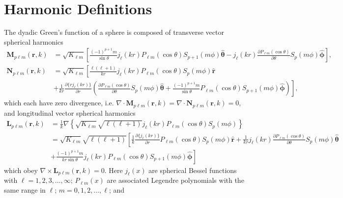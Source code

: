 
\section{Harmonic Definitions}\label{app:harmonicAlgebra}

The dyadic Green's function of a sphere is composed of transverse vector spherical harmonics
\begin{equation}
\begin{split}
\mathbf{M}_{p\ell m}(\mathbf{r},k) &= \sqrt{K_{\ell m}}\left[\frac{(-1)^{p + 1}m}{\sin\theta}j_\ell(kr)P_{\ell m}(\cos\theta)S_{p+1}(m\phi)\hat{\bm{\theta}} - j_\ell(kr)\frac{\partial P_{\ell m}(\cos\theta)}{\partial\theta}S_p(m\phi)\hat{\bm{\phi}}\right],\\[0.5em]
\mathbf{N}_{p\ell m}(\mathbf{r},k) &= \sqrt{K_{\ell m}}\left[\frac{\ell(\ell + 1)}{kr}j_\ell(kr)P_{\ell m}(\cos\theta)S_p(m\phi)\hat{\mathbf{r}}\right.\\
&+ \left.\frac{1}{kr}\frac{\partial\{rj_\ell(kr)\}}{\partial r}\left(\frac{\partial P_{\ell m}(\cos\theta)}{\partial\theta}S_p(m\phi)\hat{\bm{\theta}} + \frac{(-1)^{p+1}m}{\sin\theta}P_{\ell m}(\cos\theta)S_{p + 1}(m\phi)\hat{\bm{\phi}}\right)\right],
\end{split}
\end{equation}
which each have zero divergence, i.e. $\nabla\cdot\mathbf{M}_{p\ell m}(\mathbf{r},k) = \nabla\cdot\mathbf{N}_{p\ell m}(\mathbf{r},k) = 0$, and longitudinal vector spherical harmonics
\begin{equation}
\begin{split}
\mathbf{L}_{p\ell m}(\mathbf{r},k) &= \frac{1}{k}\nabla\left\{\sqrt{K_{\ell m}}\sqrt{\ell(\ell + 1)}j_\ell(kr)P_{\ell m}(\cos\theta)S_p(m\phi)\right\}\\
&= \sqrt{K_{\ell m}}\sqrt{\ell(\ell + 1)}\left[\frac{1}{k}\frac{\partial\{j_\ell(kr)\}}{\partial r}P_{\ell m}(\cos\theta)S_p(m\phi)\hat{\mathbf{r}} + \frac{1}{kr}j_\ell(kr)\frac{\partial P_{\ell m}(\cos\theta)}{\partial\theta}S_p(m\phi)\hat{\bm{\theta}}\right.\\
&\left. + \frac{(-1)^{p+1}m}{kr\sin\theta}j_\ell(kr)P_{\ell m}(\cos\theta)S_{p+1}(m\phi)\hat{\bm{\phi}}\right]
\end{split}
\end{equation}
which obey $\nabla\times\mathbf{L}_{p\ell m}(\mathbf{r},k) = 0$. Here $j_\ell(x)$ are spherical Bessel functions with $\ell = 1,2,3,\ldots,\infty$; $P_{\ell m}(x)$ are associated Legendre polynomials with the same range in $\ell$; $m = 0,1,2,\ldots,\ell$; and 
